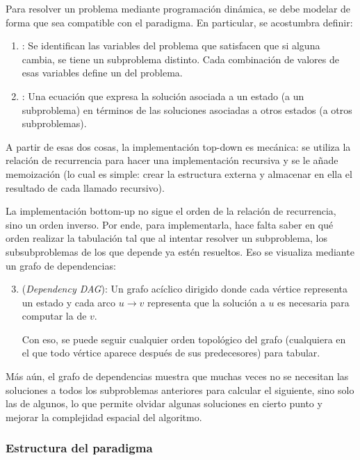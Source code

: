 Para resolver un problema mediante programación dinámica, se debe modelar de forma que sea compatible con el paradigma. En particular, se acostumbra definir:
\begin{enumerate}
    \item {}: Se identifican las variables del problema que satisfacen que si alguna cambia, se tiene un subproblema distinto. Cada combinación de valores de esas variables define un  del problema.
    \item {}: Una ecuación que expresa la solución asociada a un estado (a un subproblema) en términos de las soluciones asociadas a otros estados (a otros subproblemas).
\end{enumerate}

A partir de esas dos cosas, la implementación top-down es mecánica: se utiliza la relación de recurrencia para hacer una implementación recursiva y se le añade memoización (lo cual es simple: crear la estructura externa y almacenar en ella el resultado de cada llamado recursivo).

La implementación bottom-up no sigue el orden de la relación de recurrencia, sino un orden inverso. Por ende, para implementarla, hace falta saber en qué orden realizar la tabulación tal que al intentar resolver un subproblema, los subsubproblemas de los que depende ya estén resueltos. Eso se visualiza mediante un grafo de dependencias:
\begin{enumerate}
    \setcounter{enumi}{2}
    \item {} (\textit{Dependency DAG}): Un grafo acíclico dirigido donde cada vértice representa un estado y cada arco \(u \longrightarrow v\) representa que la solución a \(u\) es necesaria para computar la de \(v\).

    Con eso, se puede seguir cualquier orden topológico del grafo (cualquiera en el que todo vértice aparece después de sus predecesores) para tabular.
\end{enumerate}

Más aún, el grafo de dependencias muestra que muchas veces no se necesitan las soluciones a todos los subproblemas anteriores para calcular el siguiente, sino solo las de algunos, lo que permite olvidar algunas soluciones en cierto punto y mejorar la complejidad espacial del algoritmo.

\subsubsection{Estructura del paradigma}

